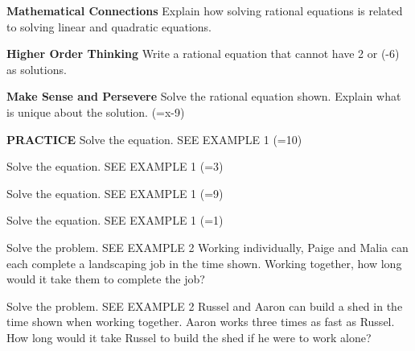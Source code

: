 \documentclass{article}
\newenvironment{practice}[2]{}{}        %
\newcommand{\answer}[1]{}               %
\newcommand{\placeholder}[2]{}          %
\begin{document}
\begin{practice}{12}{2}
\textbf{Mathematical Connections} Explain how solving rational equations is related to solving linear and quadratic equations.
\answer{Oftentimes the steps involved in solving a rational equation transform it into a linear or quadratic equation.}
\end{practice}
\begin{practice}{13}{3}
\textbf{Higher Order Thinking} Write a rational equation that cannot have 2 or (-6) as solutions.
\answer{Sample: (\frac{1}{x-2}+\frac{2}{x+6}=10)}
\end{practice}
\begin{practice}{14}{2}
\textbf{Make Sense and Persevere} Solve the rational equation shown. Explain what is unique about the solution.
(=x-9)
\answer{Sample: The equation reduces to an identity; the solution is the set of all real numbers except (-2).}
\end{practice}
\begin{practice}{15}{1}
\textbf{PRACTICE} Solve the equation. SEE EXAMPLE 1
(=10)
\answer{(x=\frac{31}{10})}
\end{practice}
\begin{practice}{16}{1}
Solve the equation. SEE EXAMPLE 1
(=3)
\answer{(x=2)}
\end{practice}
\begin{practice}{17}{1}
Solve the equation. SEE EXAMPLE 1
(=9)
\answer{(x=\frac{16}{3})}
\end{practice}
\begin{practice}{18}{1}
Solve the equation. SEE EXAMPLE 1
(=1)
\answer{(x=-2)}
\end{practice}
\begin{practice}{19}{2}
Solve the problem. SEE EXAMPLE 2
Working individually, Paige and Malia can each complete a landscaping job in the time shown. Working together, how long would it take them to complete the job?
\placeholder{illustration}{Landscaped garden with pond, shrubs and palm tree. Callouts: Malia: 4 hours; Paige: 6 hours.}
\answer{(2\frac{2}{5}) hours}
\end{practice}
\begin{practice}{20}{2}
Solve the problem. SEE EXAMPLE 2
Russel and Aaron can build a shed in the time shown when working together. Aaron works three times as fast as Russel. How long would it take Russel to build the shed if he were to work alone?
\placeholder{illustration}{Two people raise the wooden walls of an unfinished storage shed. Callout: Russel and Aaron can build the shed in 8 hours working together.}
\answer{32 hours}
\end{practice}
\end{document}
